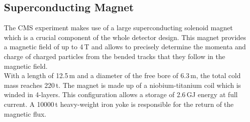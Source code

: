 \subsection{Superconducting Magnet}
\label{subsec:cms_magnet}
The CMS experiment makes use of a large superconducting solenoid magnet which is a crucial component of the whole detector design. This magnet provides a magnetic field of up to 4\,T and allows to precisely determine the momenta and charge of charged particles from the bended tracks that they follow in the magnetic field.\\
With a length of 12.5\,m and a diameter of the free bore of 6.3\,m, the total cold mass reaches 220\,t. The magnet is made up of a niobium-titanium coil which is winded in 4-layers. This configuration allows a storage of 2.6\,GJ energy at full current. A 10000\,t heavy-weight iron yoke is responsible for the return of the magnetic flux.

